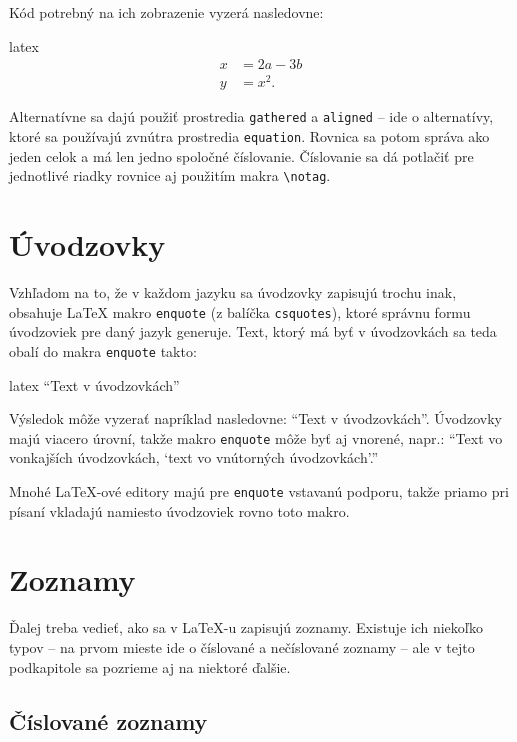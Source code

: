 Kód potrebný na ich zobrazenie vyzerá nasledovne:
\begin{inlinecode}{latex}
\begin{align}
x &= 2a - 3b \\
y &= x^2.
\end{align}
\end{inlinecode}

Alternatívne sa dajú použiť prostredia \texttt{gathered} a \texttt{aligned} -- ide o alternatívy, ktoré sa používajú zvnútra prostredia \texttt{equation}. Rovnica sa potom správa ako jeden celok a má len jedno spoločné číslovanie. Číslovanie sa dá potlačiť pre jednotlivé riadky rovnice aj použitím makra \texttt{{\textbackslash}notag}.

\section{Úvodzovky}

Vzhľadom na to, že v každom jazyku sa úvodzovky zapisujú trochu inak, obsahuje LaTeX makro \texttt{enquote} (z balíčka \texttt{csquotes}), ktoré správnu formu úvodzoviek pre daný jazyk generuje. Text, ktorý má byť v úvodzovkách sa teda obalí do makra \texttt{enquote} takto:
\begin{inlinecode}{latex}
\enquote{Text v úvodzovkách}
\end{inlinecode}

Výsledok môže vyzerať napríklad nasledovne: \enquote{Text v úvodzovkách}. Úvodzovky majú viacero úrovní, takže makro \texttt{enquote} môže byť aj vnorené, napr.: \enquote{Text vo vonkajších úvodzovkách, \enquote{text vo vnútorných úvodzovkách}.}

Mnohé LaTeX-ové editory majú pre \texttt{enquote} vstavanú podporu, takže priamo pri písaní vkladajú namiesto úvodzoviek rovno toto makro.

\section{Zoznamy}

Ďalej treba vedieť, ako sa v LaTeX-u zapisujú zoznamy. Existuje ich niekoľko typov -- na prvom mieste ide o číslované a nečíslované zoznamy -- ale v tejto podkapitole sa pozrieme aj na niektoré ďalšie.

\subsection{Číslované zoznamy}

